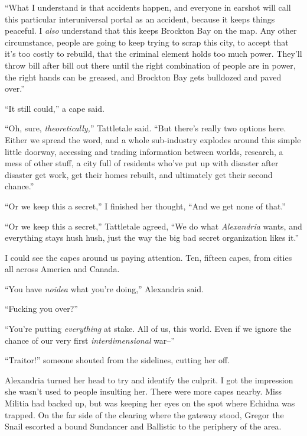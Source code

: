 ``What I understand is that accidents happen, and everyone in earshot will call this particular interuniversal portal as an accident, because it keeps things peaceful.  I \emph{also} understand that this keeps Brockton Bay on the map.  Any other circumstance, people are going to keep trying to scrap this city, to accept that it's too costly to rebuild, that the criminal element holds too much power.  They'll throw bill after bill out there until the right combination of people are in power, the right hands can be greased, and Brockton Bay gets bulldozed and paved over.''



``It still could,'' a cape said.



``Oh, sure, \emph{theoretically,}'' Tattletale said.  ``But there's really two options here.  Either we spread the word, and a whole sub-industry explodes around this simple little doorway, accessing and trading information between worlds, research, a mess of other stuff, a city full of residents who've put up with disaster after disaster get work, get their homes rebuilt, and ultimately get their second chance.''



``Or we keep this a secret,'' I finished her thought, ``And we get none of that.''



``Or we keep this a secret,'' Tattletale agreed, ``We do what \emph{Alexandria} wants, and everything stays hush hush, just the way the big bad secret organization likes it.''



I could see the capes around us paying attention.  Ten, fifteen capes, from cities all across America and Canada.



``You have \emph{no}\emph{idea} what you're doing,'' Alexandria said.



``Fucking you over?''



``You're putting \emph{everything} at stake.  All of us, this world.  Even if we ignore the chance of our very first \emph{interdimensional} war--''



``Traitor!'' someone shouted from the sidelines, cutting her off.



Alexandria turned her head to try and identify the culprit.  I got the impression she wasn't used to people insulting her.  There were more capes nearby.  Miss Militia had backed up, but was keeping her eyes on the spot where Echidna was trapped.  On the far side of the clearing where the gateway stood, Gregor the Snail escorted a bound Sundancer and Ballistic to the periphery of the area.



